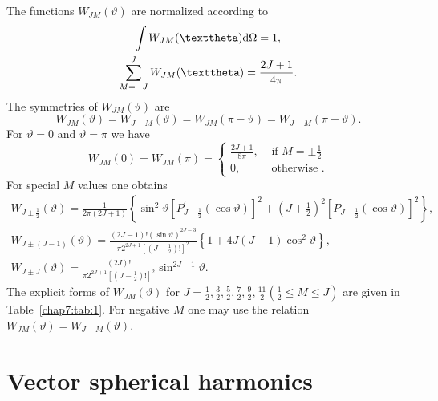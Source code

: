 The functions $W_{J M}(\vartheta)$ are normalized according to
\begin{gather}
\int W_{J M}(\vartheta) \dd \Omega=1, \label{eq:7:2:51}\\
\sum_{M=-J}^{J} W_{J M}(\vartheta)=\frac{2 J+1}{4 \pi}. \notag
\end{gather}
The symmetries of $W_{J M}(\vartheta)$ are
\begin{equation}
W_{J M}(\vartheta)=W_{J-M}(\vartheta)=W_{J M}(\pi-\vartheta)=W_{J-M}(\pi-\vartheta) . \label{eq:7:2:52}
\end{equation}
For $\vartheta=0$ and $\vartheta=\pi$ we have
\begin{equation}
W_{J M}(0)=W_{J M}(\pi)= \begin{cases}\frac{2 J+1}{8 \pi}, & \text { if } M= \pm \frac{1}{2} \\ 0, & \text { otherwise .}\end{cases} \label{eq:7:2:53}
\end{equation}
For special $M$ values one obtains
\begin{gather}
W_{J \pm \frac{1}{2}}(\vartheta)=\frac{1}{2 \pi(2 J+1)}\left\{\sin ^{2} \vartheta\left[P_{J-\frac{1}{2}}^{\prime}(\cos \vartheta)\right]^{2}+\left(J+\frac{1}{2}\right)^{2}\left[P_{J-\frac{1}{2}}(\cos \vartheta)\right]^{2}\right\}, \label{eq:7:2:54}\\
W_{J \pm(J-1)}(\vartheta)=\frac{(2 J-1)!(\sin \vartheta)^{2 J-3}}{\pi 2^{2 J+1}\left[\left(J-\frac{1}{2}\right)!\right]^{2}}\left\{1+4 J(J-1) \cos ^{2} \vartheta\right\}, \label{eq:7:2:55}\\
W_{J \pm J}(\vartheta)=\frac{(2 J)!}{\pi 2^{2 J+1}\left[\left(J-\frac{1}{2}\right)!\right]^{2}} \sin ^{2 J-1} \vartheta. \label{eq:7:2:56}
\end{gather}
The explicit forms of $W_{J M}(\vartheta)$ for $J=\frac{1}{2}, \frac{3}{2}, \frac{5}{2}, \frac{7}{2}, \frac{9}{2}, \frac{11}{2}\left(\frac{1}{2} \leq M \leq J\right)$ are given in Table~\ref{chap7:tab:1}. For negative $M$ one may use the relation $W_{J M}(\vartheta)=W_{J-M}(\vartheta)$.

\section{Vector spherical harmonics}\label{sec:7.3}
